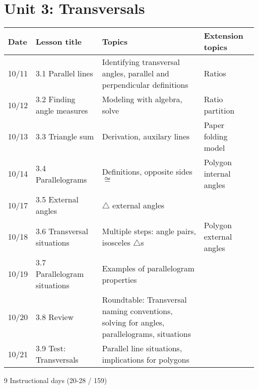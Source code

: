 \section*{Unit 3: Transversals}
\begin{tabular}{|p{0.9cm}|p{4cm}|p{7cm}|p{5cm}|}
  \hline
  Date & Lesson title & Topics  & Extension topics \\
  \hline
  10/11 & 3.1 Parallel lines & Identifying transversal angles, parallel and perpendicular definitions & Ratios \\
  \hline
  10/12 & 3.2 Finding angle measures & Modeling with algebra, solve & Ratio partition \\
  \hline
  10/13 & 3.3 Triangle sum & Derivation, auxilary lines & Paper folding model \\
  \hline
  10/14 & 3.4 Parallelograms & Definitions, opposite sides $\cong$ & Polygon internal angles \\
  \hline
  10/17 & 3.5 External angles & $\triangle$ external angles &  \\
  \hline
  10/18 & 3.6 Transversal situations & Multiple steps: angle pairs, isosceles $\triangle$s & Polygon external angles \\
  \hline
  10/19 & 3.7 Parallelogram situations & Examples of parallelogram properties &  \\
  \hline
  10/20 & 3.8 Review & Roundtable: Transversal naming conventions, solving for angles, parallelograms, situations & \\
  \hline
  10/21 & 3.9 Test: Transversals & Parallel line situations, implications for polygons &  \\
  \hline

\end{tabular} \par \vspace*{0.3cm}
9 Instructional days (20-28 / 159)


\newpage


